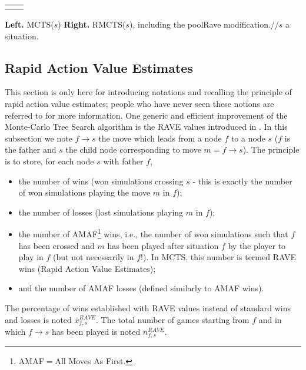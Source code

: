 \documentclass{llncs}
\begin{document}
\begin{algorithm}
\begin{center}
\begin{scriptsize}
\begin{tabular}{p{0.5\linewidth}|p{0.5\linewidth}}
\begin{minipage}[p]{\linewidth}
       \end{minipage}

\end{tabular}


\caption{\label{cmcalgo}{\bf{Left.}} MCTS($s$) {\bf{Right.}} RMCTS($s$), including the poolRave modification.//$s$ a situation.}

\end{scriptsize}
\end{center}
\end{algorithm}


\subsection{Rapid Action Value Estimates}

This section is only here for introducing notations and recalling the principle of rapid action value estimates; people who have never seen these notions are referred to \cite{icmlmogo} for more information.
One generic and efficient improvement of the Monte-Carlo Tree Search algorithm is the RAVE values introduced in \cite{bruegmann,icmlmogo}.
In this subsection we note $f\to s$ the move which leads from a node $f$ to a node $s$ ($f$ is the father and $s$ the child node corresponding to move $m=f\to s$).
The principle is to store, for each node $s$ with father $f$, 
\begin{itemize}
\item the number of wins (won simulations crossing $s$ - this is exactly the number of won simulations playing the move $m$ in $f$);
\item the number of losses (lost simulations playing $m$ in $f$);
\item the number of AMAF\footnote{AMAF$=$All Moves As First.} wins, i.e., the number of won simulations such that $f$ has been crossed and $m$ has been played after situation $f$ by the player to play in $f$ (but not necessarily in $f$!). In MCTS, this number is termed RAVE wins (Rapid Action Value Estimates);
\item and the number of AMAF losses (defined similarly to AMAF wins).
\end{itemize} 
The percentage of wins established with RAVE values instead of standard wins and losses is noted $\bar{x}_{f,s}^{RAVE}$.
The total number of games starting from $f$ and in which $f\to s$ has been played is noted $n_{f,s}^{RAVE}$.
\end{document}
